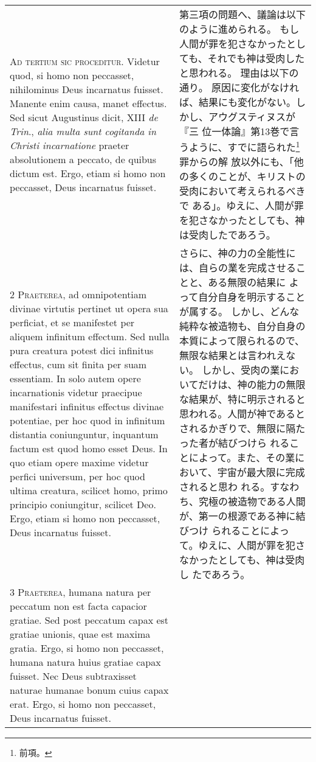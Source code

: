 \documentclass[10pt]{jsarticle} %
\begin{document}
\begin{longtable}{p{21em}p{21em}}

{\Huge A}{\scshape d tertium sic proceditur}. Videtur quod,
si homo non peccasset, nihilominus Deus incarnatus fuisset. Manente enim
causa, manet effectus. Sed sicut Augustinus dicit, XIII {\itshape de Trin}., {\itshape alia
multa sunt cogitanda in Christi incarnatione} praeter absolutionem a
peccato, de quibus dictum est. Ergo, etiam si homo non peccasset, Deus
incarnatus fuisset.


&

第三項の問題へ、議論は以下のように進められる。
もし人間が罪を犯さなかったとしても、それでも神は受肉したと思われる。
理由は以下の通り。
原因に変化がなければ、結果にも変化がない。しかし、アウグスティヌスが『三
 位一体論』第13巻で言うように、すでに語られた\footnote{前項。}罪からの解
 放以外にも、「他の多くのことが、キリストの受肉において考えられるべきで
 ある」。ゆえに、人間が罪を犯さなかったとしても、神は受肉したであろう。


\\


2 {\scshape Praeterea}, ad omnipotentiam divinae
virtutis pertinet ut opera sua perficiat, et se manifestet per aliquem
infinitum effectum. Sed nulla pura creatura potest dici infinitus
effectus, cum sit finita per suam essentiam. In solo autem opere
incarnationis videtur praecipue manifestari infinitus effectus divinae
potentiae, per hoc quod in infinitum distantia coniunguntur, inquantum
factum est quod homo esset Deus. In quo etiam opere maxime videtur
perfici universum, per hoc quod ultima creatura, scilicet homo, primo
principio coniungitur, scilicet Deo. Ergo, etiam si homo non peccasset,
Deus incarnatus fuisset.


&

さらに、神の力の全能性には、自らの業を完成させることと、ある無限の結果に
 よって自分自身を明示することが属する。
しかし、どんな純粋な被造物も、自分自身の本質によって限られるので、無限な結果とは言われえない。
しかし、受肉の業においてだけは、神の能力の無限な結果が、特に明示されると
 思われる。人間が神であるとされるかぎりで、無限に隔たった者が結びつけら
 れることによって。また、その業において、宇宙が最大限に完成されると思わ
 れる。すなわち、究極の被造物である人間が、第一の根源である神に結びつけ
 られることによって。ゆえに、人間が罪を犯さなかったとしても、神は受肉し
 たであろう。

\\


3 {\scshape Praeterea}, humana natura per peccatum non
est facta capacior gratiae. Sed post peccatum capax est gratiae unionis,
quae est maxima gratia. Ergo, si homo non peccasset, humana natura huius
gratiae capax fuisset. Nec Deus subtraxisset naturae humanae bonum cuius
capax erat. Ergo, si homo non peccasset, Deus incarnatus fuisset.



\end{longtable}
\end{document}
